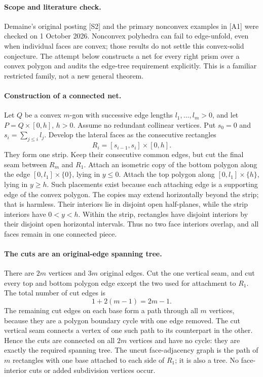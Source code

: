 \documentclass[11pt,a4paper]{article}
\begin{document}
\paragraph{Scope and literature check.}
Demaine's original posting [S2] and the primary nonconvex examples in [A1]
were checked on 1 October 2026. Nonconvex polyhedra can fail to edge-unfold,
even when individual faces are convex; those results do not settle this
convex-solid conjecture. The attempt below constructs a net for every right
prism over a convex polygon and audits the edge-tree requirement explicitly.
This is a familiar restricted family, not a new general theorem.

\paragraph{Construction of a connected net.}
Let $Q$ be a convex $m$-gon with successive edge lengths
$l_1,\ldots,l_m>0$, and let $P=Q\times[0,h]$, $h>0$. Assume no redundant
collinear vertices. Put $s_0=0$ and $s_i=\sum_{j\le i}l_j$. Develop the lateral
faces as the consecutive rectangles
\[
                       R_i=[s_{i-1},s_i]\times[0,h].
\]
They form one strip. Keep their consecutive common edges, but cut the final
seam between $R_m$ and $R_1$. Attach an isometric copy of the bottom polygon
along the edge $[0,l_1]\times\{0\}$, lying in $y\le0$. Attach the top polygon
along $[0,l_1]\times\{h\}$, lying in $y\ge h$.
Such placements exist because each attaching edge is a supporting edge of
the convex polygon. The copies may extend horizontally beyond the strip;
that is harmless. Their interiors lie in disjoint open half-planes, while
the strip interiors have $0<y<h$. Within the strip, rectangles have disjoint
interiors by their disjoint open horizontal intervals. Thus no two face
interiors overlap, and all faces remain in one connected piece.

\paragraph{The cuts are an original-edge spanning tree.}
There are $2m$ vertices and $3m$ original edges. Cut the one vertical seam,
and cut every top and bottom polygon edge except the two used for attachment
to $R_1$. The total number of cut edges is
\[
                       1+2(m-1)=2m-1.
\]
The remaining cut edges on each base form a path through all $m$ vertices,
because they are a polygon boundary cycle with one edge removed. The cut
vertical seam connects a vertex of one such path to its counterpart in the
other. Hence the cuts are connected on all $2m$ vertices and have no cycle:
they are exactly the required spanning tree. The uncut face-adjacency graph
is the path of $m$ rectangles with one base attached to each side of $R_1$;
it is also a tree. No face-interior cuts or added subdivision vertices occur.
\end{document}
